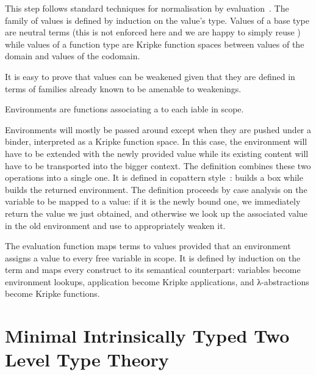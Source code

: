 \documentclass{article}
\begin{document}
This step follows standard techniques for normalisation
by evaluation~\cite{DBLP:conf/lics/BergerS91,DBLP:journals/mscs/CoquandD97,DBLP:journals/lisp/Coquand02}.
The family of values is defined by induction on the value's
type.
%
Values of a base type are neutral terms (this is not enforced here and
we are happy to simply reuse ) while values of a function type
are Kripke function spaces between values of the domain and values of
the codomain.


It is easy to prove that values can be weakened given that they are
defined in terms of families already known to be amenable to weakenings.


Environments are functions associating a 
to each iable in scope.


Environments will mostly be passed around except when they are pushed
under a binder, interpreted as a Kripke function space.
%
In this case, the environment will have to be extended with the newly
provided value while its existing content will have to be transported
into the bigger context.
%
The  definition combines these two operations into a single
one. It is defined in copattern style~\cite{DBLP:conf/popl/AbelPTS13}:
{} builds a box while {} builds the
returned environment. The definition proceeds by case analysis on the
variable to be mapped to a value: if it is the newly bound one, we
immediately return the value we just obtained, and otherwise we look
up the associated value in the old environment and use  to
appropriately weaken it.


The evaluation function maps terms to values provided that
an environment assigns a value to every free variable in scope.
It is defined by induction on the term and maps every construct
to its semantical counterpart: variables become environment lookups,
application become Kripke applications, and λ-abstractions become
Kripke functions.

\begin{AgdaSuppressSpace}
\end{AgdaSuppressSpace}

\section{Minimal Intrinsically Typed Two Level Type Theory}
\end{document}
